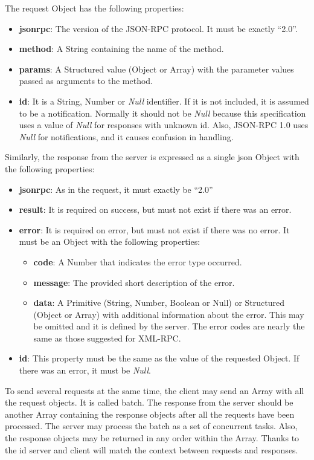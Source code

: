 \documentclass[a4paper, 12pt]{article} %
\begin{document}
            The request Object has the following properties:
            \begin{itemize}
                \item \textbf{jsonrpc}: The version of the JSON-RPC protocol. It must be exactly “2.0”.
                \item \textbf{method}: A String containing the name of the method.
                \item \textbf{params}: A Structured value (Object or Array) with the parameter values passed as arguments to the method.
                \item \textbf{id}: It is a String, Number or \textit{Null} identifier. If it is not included, it is assumed to be a notification. Normally it should not be \textit{Null} because this specification uses a value of \textit{Null} for responses with unknown id. Also, JSON-RPC 1.0 uses \textit{Null} for notifications, and it causes confusion in handling.
            \end{itemize}
            Similarly, the response from the server is expressed as a single \acrshort{json} Object with the following properties:
            \begin{itemize}
                \item \textbf{jsonrpc}: As in the request, it must exactly be “2.0”
                \item \textbf{result}: It is required on success, but must not exist if there was an error.
                \item \textbf{error}: It is required on error, but must not exist if there was no error. It must be an Object with the following properties:
                \begin{itemize}
                    \item \textbf{code}: A Number that indicates the error type occurred.
                    \item \textbf{message}: The provided short description of the error.
                    \item \textbf{data}: A Primitive (String, Number, Boolean or Null) or Structured (Object or Array) with additional information about the error. This may be omitted and it is defined by the server. The error codes are nearly the same as those suggested for XML-RPC\cite{rpc-err}.
                \end{itemize}
                \item \textbf{id}: This property must be the same as the value of the requested Object. If there was an error, it must be \textit{Null}.
            \end{itemize}
            To send several requests at the same time, the client may send an Array with all the request objects. It is called batch. The response from the server should be another Array containing the response objects after all the requests have been processed. The server may process the batch as a set of concurrent tasks. Also, the response objects may be returned in any order within the Array. Thanks to the id server and client will match the context between requests and responses.
            
\end{document}
